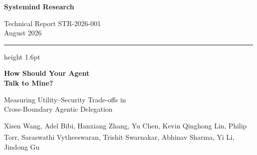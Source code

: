 \documentclass[10pt,a4paper]{article}
\begin{document}
\begin{titlepage}
\thispagestyle{empty}

\noindent
\begin{minipage}{0.6\textwidth}
  {\sffamily\bfseries\Large{\color{OxfordBlue}Systemind} {\color{ColumbiaBlue}Research}}
\end{minipage}
\hfill
\begin{minipage}{0.36\textwidth}\raggedleft
  {\sffamily\footnotesize\color{AicooSlate}Technical Report STR-2026-001\\August 2026}
\end{minipage}

\vspace{6pt}
{\color{AicooGold}\hrule height 1.6pt}

\vspace{2.2cm}

{\raggedright
\sffamily\bfseries\fontsize{27}{33}\selectfont\color{AicooNavy}
How Should Your Agent\\Talk to Mine?\par}

\vspace{0.5cm}
{\raggedright\sffamily\fontsize{15}{20}\selectfont\color{AicooBlue}
Measuring Utility--Security Trade-offs in\\Cross-Boundary Agentic Delegation\par}

\vspace{1.4cm}

{\raggedright\sffamily\color{AicooInk}
Xisen Wang, Adel Bibi, Hanxiang Zhang, Yu Chen, Kevin Qinghong Lin, Philip Torr, Saraswathi Vytheeswaran\textsuperscript{\dag}, Trishit Swarnakar\textsuperscript{\dag}, Abhinav Sharma\textsuperscript{\dag}, Yi Li\textsuperscript{\dag}, Jindong Gu\par}


\vspace{1.3cm}


\end{titlepage}
\end{document}
